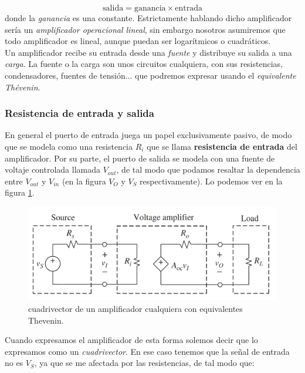 \documentclass[12pt,a4paper]{article}
\numberwithin{equation}{section}
\numberwithin{figure}{section}
\begin{document}
\begin{equation}
\mathrm{salida} = \mathrm{ganancia}  \times \mathrm{entrada}
\end{equation}
donde la \textit{ganancia} es una constante. Estrictamente hablando dicho amplificador sería un \textit{amplificador operacional lineal}, sin embargo nosotros asumiremos que todo amplificador es lineal, aunque puedan ser logarítmicos o cuadráticos. \\

Un amplificador recibe su entrada desde una \textit{fuente} y distribuye su salida a una \textit{carga}. La fuente o la carga son unos circuitos cualquiera, con sus resistencias, condensadores, fuentes de tensión... que podremos expresar usando el \textit{equivalente Thévenin}.  \\


\subsubsection{Resistencia de entrada y salida}

En general el puerto de entrada juega un papel exclusivamente pasivo, de modo que se modela como una resistencia $R_i$ que se llama \textbf{resistencia de entrada} del amplificador. Por su parte, el puerto de salida se modela con una fuente de voltaje controlada llamada $V_{out}$, de tal modo que podamos resaltar la dependencia entre $V_{out}$ y $V_{in}$ (en la figura $V_O$ y $V_S$ respectivamente). Lo podemos ver en la figura \ref{Fig:1.1-Cuadrivector}. \\



\begin{figure}[h!] \centering
\includegraphics[scale=0.35]{1.1-Cuadrivector.png}
\caption{cuadrivector de un amplificador cualquiera con equivalentes Thevenin.}
\label{Fig:1.1-Cuadrivector}
\end{figure}

Cuando expresamos el amplificador de esta forma solemos decir que lo expresamos como un \textit{cuadrivector}. En ese caso tenemos que la señal de entrada no es $V_S$, ya que se me afectada por las resistencias, de tal modo que:
\end{document}
